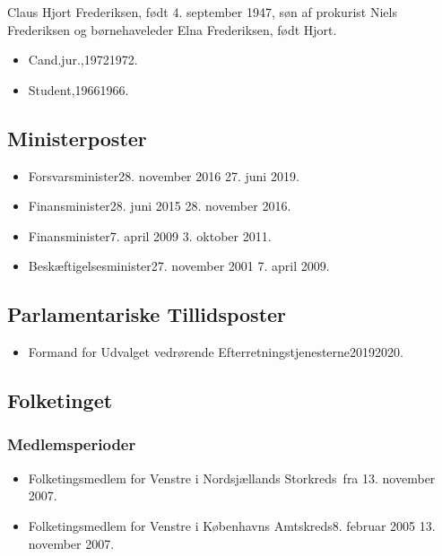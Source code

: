 \documentclass[11pt, a4paper]{awesome-cv}
\begin{document}
\makecvheader[R]
\makelettertitle
\begin{cvletter}
Claus Hjort Frederiksen, født 4. september 1947, søn af prokurist Niels Frederiksen og børnehaveleder Elna Frederiksen, født Hjort.

\begin{itemize}
\item Cand.jur.,19721972.
\item Student,19661966.
\end{itemize}
\subsection*{Ministerposter}
\begin{itemize}
\item Forsvarsminister28. november 2016  27. juni 2019.
\item Finansminister28. juni 2015  28. november 2016.
\item Finansminister7. april 2009  3. oktober 2011.
\item Beskæftigelsesminister27. november 2001  7. april 2009.
\end{itemize}
\subsection*{Parlamentariske Tillidsposter}
\begin{itemize}
\item Formand for Udvalget vedrørende Efterretningstjenesterne20192020.
\end{itemize}
\subsection*{Folketinget}
\subsubsection*{Medlemsperioder}
\begin{itemize}
\item Folketingsmedlem for Venstre i Nordsjællands Storkreds fra 13. november 2007.
\item Folketingsmedlem for Venstre i Københavns Amtskreds8. februar 2005  13. november 2007.
\end{itemize}

\end{cvletter}
\end{document}
